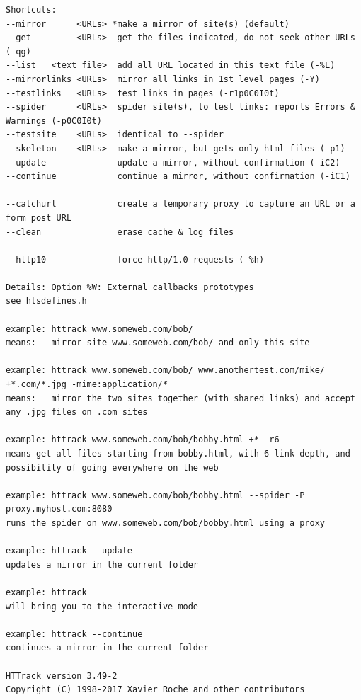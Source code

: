 \documentclass{article}
\begin{document}
\begin{lstlisting}
Shortcuts:
--mirror      <URLs> *make a mirror of site(s) (default)
--get         <URLs>  get the files indicated, do not seek other URLs (-qg)
--list   <text file>  add all URL located in this text file (-%L)
--mirrorlinks <URLs>  mirror all links in 1st level pages (-Y)
--testlinks   <URLs>  test links in pages (-r1p0C0I0t)
--spider      <URLs>  spider site(s), to test links: reports Errors & Warnings (-p0C0I0t)
--testsite    <URLs>  identical to --spider
--skeleton    <URLs>  make a mirror, but gets only html files (-p1)
--update              update a mirror, without confirmation (-iC2)
--continue            continue a mirror, without confirmation (-iC1)

--catchurl            create a temporary proxy to capture an URL or a form post URL
--clean               erase cache & log files

--http10              force http/1.0 requests (-%h)

Details: Option %W: External callbacks prototypes
see htsdefines.h

example: httrack www.someweb.com/bob/
means:   mirror site www.someweb.com/bob/ and only this site

example: httrack www.someweb.com/bob/ www.anothertest.com/mike/ +*.com/*.jpg -mime:application/*
means:   mirror the two sites together (with shared links) and accept any .jpg files on .com sites

example: httrack www.someweb.com/bob/bobby.html +* -r6
means get all files starting from bobby.html, with 6 link-depth, and possibility of going everywhere on the web

example: httrack www.someweb.com/bob/bobby.html --spider -P proxy.myhost.com:8080
runs the spider on www.someweb.com/bob/bobby.html using a proxy

example: httrack --update
updates a mirror in the current folder

example: httrack
will bring you to the interactive mode

example: httrack --continue
continues a mirror in the current folder

HTTrack version 3.49-2
Copyright (C) 1998-2017 Xavier Roche and other contributors
\end{lstlisting}
\end{document}
